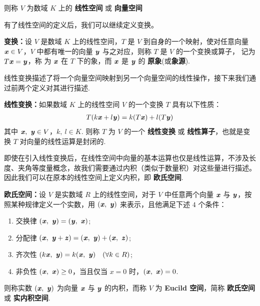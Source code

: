             则称 $V$ 为数域 $K$ 上的 \textbf{线性空间} 或 \textbf{向量空间} \\
            
            \par 有了线性空间的定义后，我们可以继续定义变换。
            \par \textbf{变换：}设 $V$ 是数域 $K$ 上的线性空间，$T$ 是 $V$ 到自身的一个映射，使对任意向量 $\textbf{\textit{x}} \in V$，$V$ 中都有唯一的向量 $\textbf{\textit{y}}$ 与之对应，则称 $T$ 是 $V$ 的一个变换或算子， 记为 $T\textbf{\textit{x}}=\textbf{\textit{y}}$，称 为 $\textbf{\textit{x}}$ 在 $T$ 下的象，而 $\textbf{\textit{x}}$ 是 $\textbf{\textit{y}}$ 的 \textbf{原象}(或\textbf{象源}). \\
            
            \par 线性变换描述了将一个向量空间映射到另一个向量空间的线性操作，接下来我们通过前两个定义对其进行描述.
            \par \textbf{线性变换：}如果数域 $K$ 上的线性空间 $V$ 的一个变换 $T$ 具有以下性质：
                \begin{align*}
                    T(k\textbf{\textit{x}} + l\textbf{\textit{y}}) = k(T\textbf{\textit{x}}) + l(T\textbf{\textit{y}}) 
                \end{align*}
            其中 $\textbf{\textit{x}}, \ \textbf{\textit{y}} \in V$，$k, \ l \in K$. 则称 $T$ 为 $V$ 的一个 \textbf{线性变换} 或 \textbf{线性算子}，也就是变换 $T$  对向量的线性运算是封闭的. \\

            \par 即使在引入线性变换后，在线性空间中向量的基本运算也仅是线性运算，不涉及长度、夹角等度量概念，故我们需要通过内积（类似于数量积）对这些量进行描述。因此我们可以在原本的线性空间上定义内积，即 \textbf{欧氏空间}.
            \par \textbf{欧氏空间：}设 $V$ 是实数域 $R$ 上的线性空间，对于 $V$ 中任意两个向量 $\textbf{\textit{x}}$ 与 $\textbf{\textit{y}}$，按照某种规律定义一个实数，用 $(\textbf{\textit{x}}, \ \textbf{\textit{y}})$ 来表示，且他满足下述 $4$ 个条件：
            \begin{enumerate}
                \item 交换律 $(\textbf{\textit{x}}, \ \textbf{\textit{y}}) = (\textbf{\textit{y}}, \ \textbf{\textit{x}})$;
                \item 分配律 $(\textbf{\textit{x}}, \ \textbf{\textit{y}} + \textbf{\textit{z}}) = (\textbf{\textit{x}}, \ \textbf{\textit{y}}) + (\textbf{\textit{x}}, \ \textbf{\textit{z}})$;
                \item 齐次性 $(k\textbf{\textit{x}}, \ \textbf{\textit{y}}) = k(\textbf{\textit{x}}, \ \textbf{\textit{y}}) \quad (\forall k \in R)$;
                \item 非负性 $(\textbf{\textit{x}}, \ \textbf{\textit{x}}) \geq 0$，当且仅当 $x = 0$ 时，$(\textbf{\textit{x}}, \ \textbf{\textit{x}}) = 0$.
            \end{enumerate}
            则称实数 $(\textbf{\textit{x}}, \ \textbf{\textit{y}})$ 为向量 $\textbf{\textit{x}}$ 与 $\textbf{\textit{y}}$ 的内积，而称 $V$ 为 \textbf{Eucild 空间}，简称 \textbf{欧氏空间} 或 \textbf{实内积空间}.
